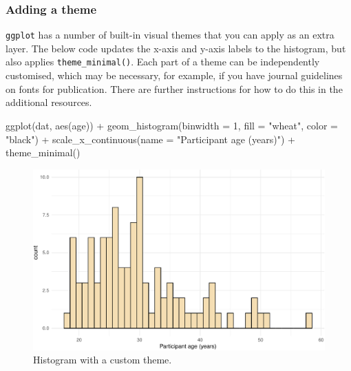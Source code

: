 \documentclass[
  english,
  doc,floatsintext]{apa6}
\newenvironment{Shaded}{\begin{snugshade}}{\end{snugshade}}
\newcommand{\AttributeTok}[1]{\textcolor[rgb]{0.77,0.63,0.00}{#1}}
\newcommand{\DecValTok}[1]{\textcolor[rgb]{0.00,0.00,0.81}{#1}}
\newcommand{\FunctionTok}[1]{\textcolor[rgb]{0.00,0.00,0.00}{#1}}
\newcommand{\NormalTok}[1]{#1}
\newcommand{\SpecialCharTok}[1]{\textcolor[rgb]{0.00,0.00,0.00}{#1}}
\newcommand{\StringTok}[1]{\textcolor[rgb]{0.31,0.60,0.02}{#1}}
\begin{document}
\hypertarget{adding-a-theme}{%
\subsubsection{Adding a theme}\label{adding-a-theme}}

\texttt{ggplot} has a number of built-in visual themes that you can apply as an extra layer. The below code updates the x-axis and y-axis labels to the histogram, but also applies \texttt{theme\_minimal()}. Each part of a theme can be independently customised, which may be necessary, for example, if you have journal guidelines on fonts for publication. There are further instructions for how to do this in the additional resources.

\begin{Shaded}
\begin{Highlighting}[]
\FunctionTok{ggplot}\NormalTok{(dat, }\FunctionTok{aes}\NormalTok{(age)) }\SpecialCharTok{+}
  \FunctionTok{geom\_histogram}\NormalTok{(}\AttributeTok{binwidth =} \DecValTok{1}\NormalTok{, }\AttributeTok{fill =} \StringTok{"wheat"}\NormalTok{, }\AttributeTok{color =} \StringTok{"black"}\NormalTok{) }\SpecialCharTok{+}
  \FunctionTok{scale\_x\_continuous}\NormalTok{(}\AttributeTok{name =} \StringTok{"Participant age (years)"}\NormalTok{) }\SpecialCharTok{+}
  \FunctionTok{theme\_minimal}\NormalTok{()}
\end{Highlighting}
\end{Shaded}

\begin{figure}

{\centering \includegraphics[width=1\linewidth]{images/histogram-theme-1} 

}

\caption{Histogram with a custom theme.}\label{fig:histogram-theme}
\end{figure}
\end{document}
